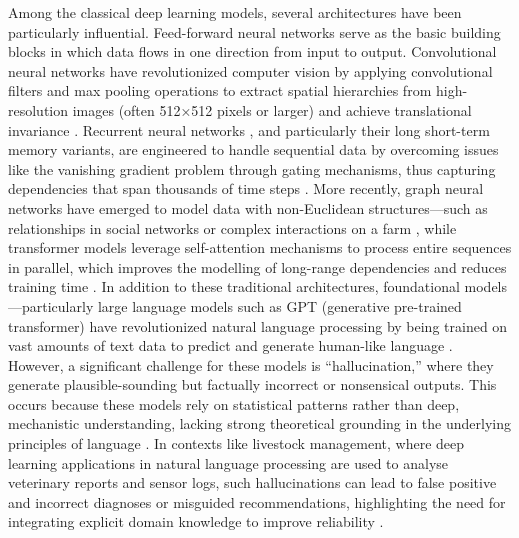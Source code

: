 Among the classical deep learning models, several architectures have been particularly influential. Feed-forward neural networks serve as the basic building blocks in which data flows in one direction from input to output. Convolutional neural networks  have revolutionized computer vision by applying convolutional filters and max pooling operations to extract spatial hierarchies from high-resolution images (often 512×512 pixels or larger) and achieve translational invariance \cite{lecun1998gradient, krizhevsky2012imagenet}. Recurrent neural networks , and particularly their long short-term memory  variants, are engineered to handle sequential data by overcoming issues like the vanishing gradient problem through gating mechanisms, thus capturing dependencies that span thousands of time steps 
\cite{hochreiter1997long, graves2005framewise}. More recently, graph neural networks have emerged to model data with non-Euclidean structures—such as relationships in social networks or complex interactions on a farm \cite{scarselli2009graph}, while transformer models leverage self-attention mechanisms to process entire sequences in parallel, which improves the modelling of long-range dependencies and reduces training time \cite{vaswani2017attention}. In addition to these traditional architectures, foundational models—particularly large language models such as GPT (generative pre-trained transformer) have revolutionized natural language processing by being trained on vast amounts of text data to predict and generate human-like language \cite{brown2020language}. However, a significant challenge for these models is “hallucination,” where they generate plausible-sounding but factually incorrect or nonsensical outputs. This occurs because these models rely on statistical patterns rather than deep, mechanistic understanding, lacking strong theoretical grounding in the underlying principles of language \cite{marcus2020gpt3, bender2021stochastic}. In contexts like livestock management, where deep learning applications in natural language processing are used to analyse veterinary reports and sensor logs, such hallucinations can lead to false positive and incorrect diagnoses or misguided recommendations, highlighting the need for integrating explicit domain knowledge to improve reliability .

